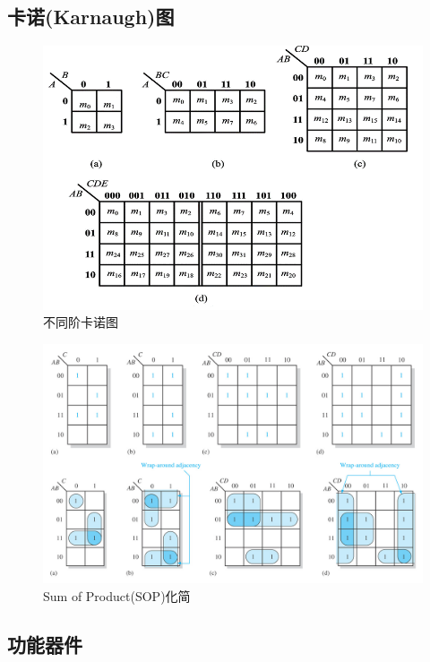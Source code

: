 \subsection{卡诺(Karnaugh)图}
\begin{figure}[htbp]
	\centering
	\includegraphics[width=0.8\linewidth]{fig/Karnaugh_graph.png}
	\caption{不同阶卡诺图}
\end{figure}
\begin{figure}[htbp]
	\centering
	\includegraphics[width=0.8\linewidth]{fig/Karnaugh_example.png}
	\caption{Sum of Product(SOP)化简}
\end{figure}

\subsection{功能器件}
